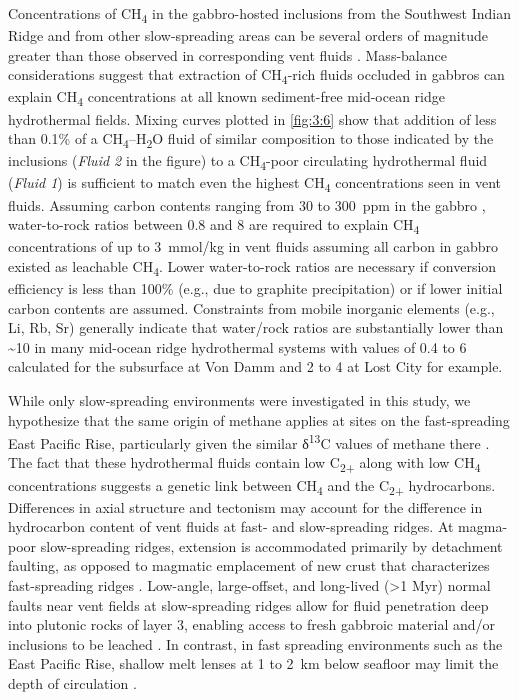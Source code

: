 Concentrations of CH\textsubscript{4} in the gabbro-hosted inclusions
from the Southwest Indian Ridge and from other slow-spreading areas can
be several orders of magnitude greater than those observed in
corresponding vent fluids \parencite{Kelley_1996_JGR,Kelley_1997}. Mass-balance
considerations suggest that extraction of CH\textsubscript{4}-rich
fluids occluded in gabbros can explain CH\textsubscript{4}
concentrations at all known sediment-free mid-ocean ridge hydrothermal
fields. Mixing curves plotted in \autoref{fig:3:6} show that addition of less than
0.1\% of a CH\textsubscript{4}--H\textsubscript{2}O fluid of similar
composition to those indicated by the inclusions (\emph{Fluid 2} in the
figure) to a CH\textsubscript{4}-poor circulating hydrothermal fluid
(\emph{Fluid 1}) is sufficient to match even the highest
CH\textsubscript{4} concentrations seen in vent fluids. Assuming carbon
contents ranging from 30 to 300~ppm in the gabbro \parencite{Kelley+FruhGreen_1999_JGR}, water-to-rock ratios between 0.8 and 8 are required
to explain CH\textsubscript{4} concentrations of up to 3~mmol/kg in vent
fluids assuming all carbon in gabbro existed as leachable
CH\textsubscript{4}. Lower water-to-rock ratios are necessary if
conversion efficiency is less than 100\% (e.g., due to graphite
precipitation) or if lower initial carbon contents are assumed.
Constraints from mobile inorganic elements (e.g., Li, Rb, Sr) generally
indicate that water/rock ratios are substantially lower than
\textasciitilde{}10 in many mid-ocean ridge hydrothermal systems \parencite{VonDamm++_1985_GCA_EPR,Berndt++_1989_GCA} with values of 0.4 to 6
calculated for the subsurface at Von Damm \parencite{McDermott_2015_thesis} and 2 to 4
at Lost City  \parencite{Foustoukos++_2008_GCA} for example.


While only slow-spreading environments were investigated in this study,
we hypothesize that the same origin of methane applies at sites on the
fast-spreading East Pacific Rise, particularly given the similar
δ\textsuperscript{13}C values of methane there \parencite{Welhan+Craig_1983}.
The fact that these hydrothermal fluids contain low C\textsubscript{2+}
along with low CH\textsubscript{4} concentrations \parencite{Keir_2010_GRL,Welhan_1988_CG} suggests a genetic link between CH\textsubscript{4} and the
C\textsubscript{2+} hydrocarbons. Differences in axial structure and
tectonism may account for the difference in hydrocarbon content of vent
fluids at fast- and slow-spreading ridges. At magma-poor slow-spreading
ridges, extension is accommodated primarily by detachment faulting, as
opposed to magmatic emplacement of new crust that characterizes
fast-spreading ridges \parencite{Buck++_2005_N,Dunn_2007_TiG}. Low-angle,
large-offset, and long-lived (\textgreater{}1 Myr) normal faults near
vent fields at slow-spreading ridges allow for fluid penetration deep
into plutonic rocks of layer 3, enabling access to fresh gabbroic
material and/or inclusions to be leached \parencite{Kelley_1996_JGR,Schroeder++_2002_G,Schlindwein+Schmid_2016_N}. In contrast, in fast spreading
environments such as the East Pacific Rise, shallow melt lenses at 1 to
2~km below seafloor may limit the depth of circulation \parencites(e.g.,)()[][]{Hasenclever++_2014_N}[and references in][]{Alt_1995_AGU-GM}.

